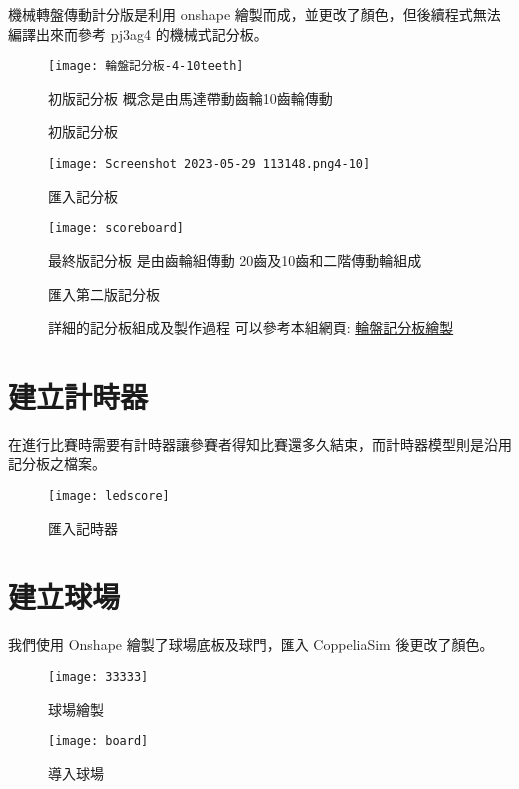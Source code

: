 機械轉盤傳動計分版是利用 onshape 繪製而成，並更改了顏色，但後續程式無法編譯出來而參考 pj3ag4 的機械式記分板。\\
\begin{figure}[hbt!]
\begin{center}
\texttt{[image: 輪盤記分板-4-10teeth]}
\caption{\Large 初版記分板}\label{初版記分板}
初版記分板 概念是由馬達帶動齒輪10齒輪傳動
\end{center}
\end{figure}
\begin{figure}[hbt!]
\begin{center}
\texttt{[image: Screenshot 2023-05-29 113148.png4-10]}
\caption{\Large 匯入記分板}\label{匯入記分板}
\end{center}
\end{figure}
\begin{figure}[hbt!]
\begin{center}
\texttt{[image: scoreboard]}
\caption{\Large 匯入第二版記分板}\label{匯入最終版記分板}
最終版記分板 是由齒輪組傳動 20齒及10齒和二階傳動輪組成
\end{center}
\end{figure}
\begin{figure}
\begin{center}
詳細的記分板組成及製作過程 可以參考本組網頁:
\href{https://mdecd2023.github.io/2a3-pj3ag1/content/輪盤記分板繪製.html}{輪盤記分板繪製}
\end{center}
\end{figure}

\section{建立計時器}
在進行比賽時需要有計時器讓參賽者得知比賽還多久結束，而計時器模型則是沿用記分板之檔案。\\
\begin{figure}[hbt!]
\begin{center}
\texttt{[image: ledscore]}
\caption{\Large 匯入記時器}\label{匯入記時器}
\end{center}
\end{figure}

\section{建立球場}
我們使用 Onshape 繪製了球場底板及球門，匯入 CoppeliaSim 後更改了顏色。\\
\begin{figure}[hbt!]
\begin{center}
\texttt{[image: 33333]}
\caption{\Large 球場繪製}\label{球場繪製}
\end{center}
\end{figure}
\begin{figure}[hbt!]
\begin{center}
\texttt{[image: board]}
\caption{\Large 導入球場}\label{導入球場}
\end{center}
\end{figure}
\newpage

\renewcommand{\baselinestretch}{0.5} %